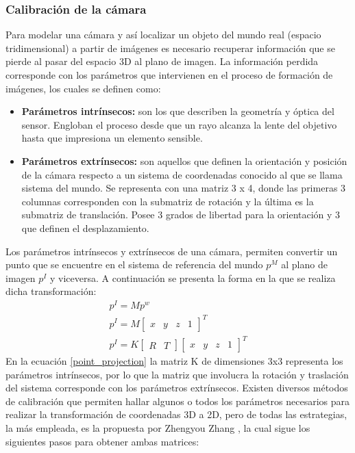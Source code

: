 \subsubsection{Calibración de la cámara}\label{calibration_section}
Para modelar una cámara y así localizar un objeto del mundo real (espacio tridimensional) a partir de imágenes es necesario recuperar información que se pierde al pasar del espacio 3D al plano de imagen. La información perdida corresponde con los parámetros que intervienen en el proceso de formación de imágenes, los cuales se definen como:
\begin{itemize}
\item \textbf{Parámetros intrínsecos:} son los que describen la geometría y óptica del sensor. Engloban el proceso desde que un rayo alcanza la lente del objetivo hasta que impresiona un elemento sensible.
\item \textbf{Parámetros extrínsecos:} son aquellos que definen la orientación y posición de la cámara respecto a un sistema de coordenadas conocido al que se llama sistema del mundo. Se representa con una matriz 3 x 4, donde las primeras 3 columnas corresponden con la submatriz de rotación y la última es la submatriz de translación. Posee 3 grados de libertad para la orientación y 3 que definen el desplazamiento.
\end{itemize} 
Los parámetros intrínsecos y extrínsecos de una cámara, permiten convertir un punto que se encuentre en el sistema de referencia del mundo $p^{M}$ al plano de imagen $p^{I}$ y viceversa. A continuación se presenta la forma en la que se realiza dicha transformación:
\begin{align}
    p^{I} = M p^{w} \\
    p^{I} = M \begin{bmatrix}
            x & y & z & 1
            \end{bmatrix}^{T} \\
    p^{I} = K \begin{bmatrix}R & T\end{bmatrix} \begin{bmatrix}
            x & y & z & 1
            \end{bmatrix}^{T}  \label{point_projection}
\end{align}
En la ecuación \ref{point_projection} la matriz K de dimensiones 3x3 representa los parámetros intrínsecos, por lo que la matriz que involucra la rotación y traslación del sistema corresponde con los parámetros extrínsecos. Existen diversos métodos de calibración que permiten hallar algunos o todos los parámetros necesarios para realizar la transformación de coordenadas 3D a 2D, pero de todas las estrategias, la más empleada, es la propuesta por Zhengyou Zhang \cite{Zhang2000}, la cual sigue los siguientes pasos para obtener ambas matrices:
